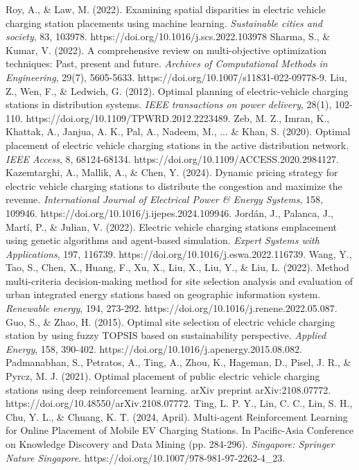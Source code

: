 \documentclass[preprint,12pt]{elsarticle}
\begin{document}
\begin{thebibliography}{00}
Roy, A., \& Law, M. (2022). Examining spatial disparities in electric vehicle charging station placements using machine learning. \textit{Sustainable cities and society}, 83, 103978. https://doi.org/10.1016/j.scs.2022.103978
Sharma, S., \& Kumar, V. (2022). A comprehensive review on multi-objective optimization techniques: Past, present and future. \textit{Archives of Computational Methods in Engineering}, 29(7), 5605-5633. https://doi.org/10.1007/s11831-022-09778-9.
Liu, Z., Wen, F., \& Ledwich, G. (2012). Optimal planning of electric-vehicle charging stations in distribution systems. \textit{IEEE transactions on power delivery}, 28(1), 102-110. https://doi.org/10.1109/TPWRD.2012.2223489.
Zeb, M. Z., Imran, K., Khattak, A., Janjua, A. K., Pal, A., Nadeem, M., ... \& Khan, S. (2020). Optimal placement of electric vehicle charging stations in the active distribution network. \textit{IEEE Access}, 8, 68124-68134. https://doi.org/10.1109/ACCESS.2020.2984127.
Kazemtarghi, A., Mallik, A., \& Chen, Y. (2024). Dynamic pricing strategy for electric vehicle charging stations to distribute the congestion and maximize the revenue. \textit{International Journal of Electrical Power \& Energy Systems}, 158, 109946. https://doi.org/10.1016/j.ijepes.2024.109946.
Jordán, J., Palanca, J., Martí, P., \& Julian, V. (2022). Electric vehicle charging stations emplacement using genetic algorithms and agent-based simulation. \textit{Expert Systems with Applications}, 197, 116739. https://doi.org/10.1016/j.eswa.2022.116739.
Wang, Y., Tao, S., Chen, X., Huang, F., Xu, X., Liu, X., Liu, Y., \& Liu, L. (2022). Method multi-criteria decision-making method for site selection analysis and evaluation of urban integrated energy stations based on geographic information system. \textit{Renewable energy}, 194, 273-292. https://doi.org/10.1016/j.renene.2022.05.087. 
Guo, S., \& Zhao, H. (2015). Optimal site selection of electric vehicle charging station by using fuzzy TOPSIS based on sustainability perspective. \textit{Applied Energy}, 158, 390-402. https://doi.org/10.1016/j.apenergy.2015.08.082.
Padmanabhan, S., Petratos, A., Ting, A., Zhou, K., Hageman, D., Pisel, J. R., \& Pyrcz, M. J. (2021). Optimal placement of public electric vehicle charging stations using deep reinforcement learning. arXiv preprint arXiv:2108.07772. https://doi.org/10.48550/arXiv.2108.07772.
Ting, L. P. Y., Lin, C. C., Lin, S. H., Chu, Y. L., \& Chuang, K. T. (2024, April). Multi-agent Reinforcement Learning for Online Placement of Mobile EV Charging Stations. In Pacific-Asia Conference on Knowledge Discovery and Data Mining (pp. 284-296). \textit{Singapore: Springer Nature Singapore}. https://doi.org/10.1007/978-981-97-2262-4\_23.

\end{thebibliography}
\end{document}

